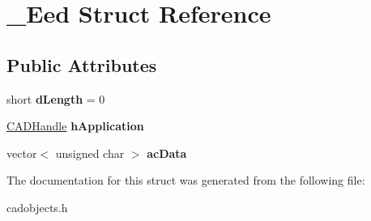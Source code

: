 \hypertarget{struct___eed}{}\section{\+\_\+\+Eed Struct Reference}
\label{struct___eed}
\subsection*{Public Attributes}
\begin{DoxyCompactItemize}
\item 
short {\bfseries d\+Length} = 0\hypertarget{struct___eed_a1eadbf5f69a0d21644289bd1bc5e625e}{}\label{struct___eed_a1eadbf5f69a0d21644289bd1bc5e625e}

\item 
\hyperlink{class_c_a_d_handle}{C\+A\+D\+Handle} {\bfseries h\+Application}\hypertarget{struct___eed_a26cd71ca65c8d44a0744a1e3894b1b2f}{}\label{struct___eed_a26cd71ca65c8d44a0744a1e3894b1b2f}

\item 
vector$<$ unsigned char $>$ {\bfseries ac\+Data}\hypertarget{struct___eed_a5acdb154445a1ae4f4c4ad7dda7acff7}{}\label{struct___eed_a5acdb154445a1ae4f4c4ad7dda7acff7}

\end{DoxyCompactItemize}


The documentation for this struct was generated from the following file\+:\begin{DoxyCompactItemize}
\item 
cadobjects.\+h\end{DoxyCompactItemize}
